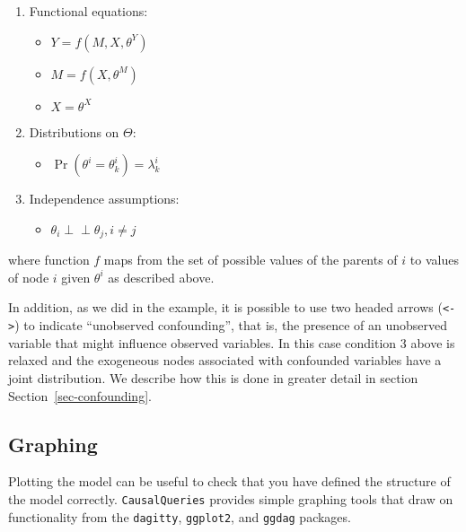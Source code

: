 \documentclass[
  11pt,
  article]{jss}
\providecommand{\tightlist}{%
  \setlength{\itemsep}{0pt}\setlength{\parskip}{0pt}}\usepackage{longtable,booktabs,array}
\begin{document}
\begin{enumerate}
\def\labelenumi{\arabic{enumi}.}
\item
  Functional equations:

  \begin{itemize}
  \tightlist
  \item
    \(Y = f(M, X, \theta^Y)\)
  \item
    \(M = f(X, \theta^M)\)
  \item
    \(X = \theta^X\)
  \end{itemize}
\item
  Distributions on \(\Theta\):

  \begin{itemize}
  \tightlist
  \item
    \(\Pr(\theta^i = \theta^i_k) = \lambda^i_k\)
  \end{itemize}
\item
  Independence assumptions:\\

  \begin{itemize}
  \tightlist
  \item
    \(\theta_i \perp\!\!\! \perp \theta_j, i\neq j\)
  \end{itemize}
\end{enumerate}

where function \(f\) maps from the set of possible values of the parents
of \(i\) to values of node \(i\) given \(\theta^i\) as described above.

In addition, as we did in the \citet{chickering1996clinician} example,
it is possible to use two headed arrows
(\texttt{\textless{}-\textgreater{}}) to indicate ``unobserved
confounding'', that is, the presence of an unobserved variable that
might influence observed variables. In this case condition 3 above is
relaxed and the exogeneous nodes associated with confounded variables
have a joint distribution. We describe how this is done in greater
detail in section Section~\ref{sec-confounding}.

\hypertarget{graphing}{%
\subsection{Graphing}\label{graphing}}

Plotting the model can be useful to check that you have defined the
structure of the model correctly. \texttt{CausalQueries} provides simple
graphing tools that draw on functionality from the \texttt{dagitty},
\texttt{ggplot2}, and \texttt{ggdag} packages.
\end{document}
